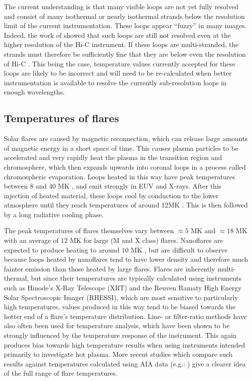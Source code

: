 \documentclass[namedreferences]{solarphysics}
\begin{document}
\begin{article}
The current understanding is that many visible loops are not yet fully resolved and consist of many isothermal or nearly isothermal strands below the resolution limit of the current instrumentation.
These loops appear ``fuzzy'' in many images.
Indeed, the work of \citet{DelZanna2013} showed that such loops are still not resolved even at the higher resolution of the Hi-C instrument.
If these loops are multi-stranded, the strands must therefore be sufficiently fine that they are below even the resolution of Hi-C \citep{Cirtain2013}.
This being the case, temperature values currently accepted for these loops are likely to be incorrect and will need to be re-calculated when better instrumentation is available to resolve the currently sub-resolution loops in enough wavelengths.

\subsection{Temperatures of flares}
Solar flares are caused by magnetic reconnection, which can release large amounts of magnetic energy in a short space of time.
This causes plasma particles to be accelerated and very rapidly heat the plasma in the transition region and chromosphere, which then expands upwards into coronal loops \citep{Simoes2015} in a process called chromospheric evaporation.
Loops heated in this way have peak temperatures between 8 and 40 MK \citep{Ryan2013,Ryan2014}, and emit strongly in EUV and X-rays.
After this injection of heated material, these loops cool by conduction to the lower atmosphere until they reach temperatures of around 12MK \citep{Aschwanden2005}.
This is then followed by a long radiative cooling phase.

The peak temperatures of flares themselves vary between $\approx 5$ MK and $\approx 18$ MK with an average of $12$ MK for large (M and X class) flares.
Nanoflares are expected to produce heating to around $10$ MK \citep{Reale2011a}, but are difficult to observe because loops heated by nanoflares tend to have lower density and therefore much fainter emission than those heated by large flares.
Flares are inherently multi-thermal, but since their temperatures are typically calculated using instruments such as Hinode's X-Ray Telescope (XRT) and the Reuven Ramaty High Energy Solar Spectroscopic Imager (RHESSI), which are most sensitive to particularly high temperatures, values produced in this way tend to be biased towards the hotter end of a flare's temperature distribution.
Line- or filter-ratio methods have also often been used for temperature analysis, which have been shown to be strongly influenced by the temperature response of the instrument.
This again produces bias towards high temperature results when using instruments intended primarily to investigate hot plasma.
More recent studies which compare such results against temperatures calculated using AIA data (e.g.: \citet{Ryan2013,Ryan2014}) give a clearer idea of the full range of flare temperatures.


\end{article}
\end{document}
